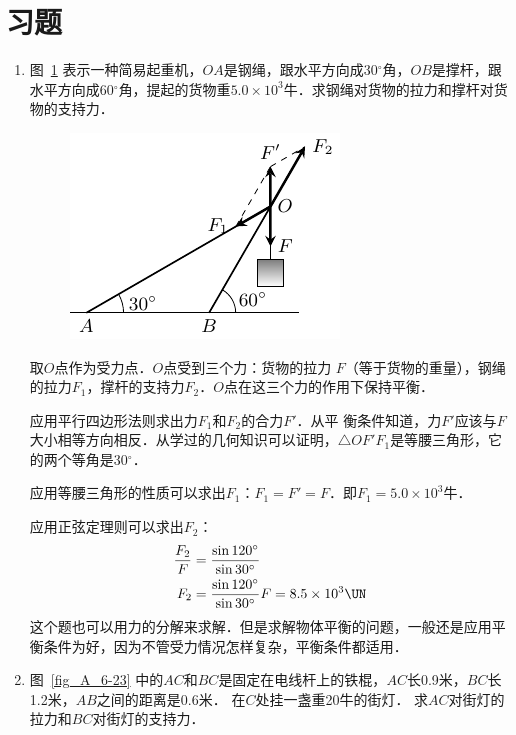 \section*{习题}
\begin{enumerate}
    \item 图~\ref{fig_A_6-22} 表示一种简易起重机，$OA$是钢绳，跟水平方向成30$^\circ$角，$OB$是撑杆，跟水平方向成60$^\circ$角，提起的货物重$5.0\times 10^3$牛．求钢绳对货物的拉力和撑杆对货物的支持力．
\begin{figure}[htbp]
    \centering
    \includegraphics{fig/A/6-22.pdf}
    \caption{}\label{fig_A_6-22}
\end{figure}

\begin{solution}
取$O$点作为受力点．$O$点受到三个力：货物的拉力
$F$（等于货物的重量），钢绳的拉力$F_1$，撑杆的支持力$F_2$．$O$点在这三个力的作用下保持平衡．

应用平行四边形法则求出力$F_1$和$F_2$的合力$F'$．从平
衡条件知道，力$F'$应该与$F$大小相等方向相反．从学过的几何知识可以证明，$\triangle OF'F_1$是等腰三角形，它的两个等角是30$^\circ$．

应用等腰三角形的性质可以求出$F_1$：$F_1=F'=F$．即$F_1=5.0\times 10^3$牛．

应用正弦定理则可以求出$F_2$：
\[\begin{split}
\frac{F_2}{F}&=\frac{\sin 120^{\circ}}{\sin 30^{\circ}}\\
F_2&=\frac{\sin 120^{\circ}}{\sin 30^{\circ}}F=8.5\times 10^3 \UN
\end{split}\]
这个题也可以用力的分解来求解．但是求解物体平衡的问题，一般还是应用平衡条件为好，因为不管受力情况怎样复杂，平衡条件都适用．
\end{solution}

\item 图~\ref{fig_A_6-23} 中的$AC$和$BC$是固定在电线杆上的铁棍，$AC$长0.9米，$BC$长1.2米，$AB$之间的距离是0.6米．
在$C$处挂一盏重20牛的街灯．
求$AC$对街灯的拉力和$BC$对街灯的支持力．


\end{enumerate}
